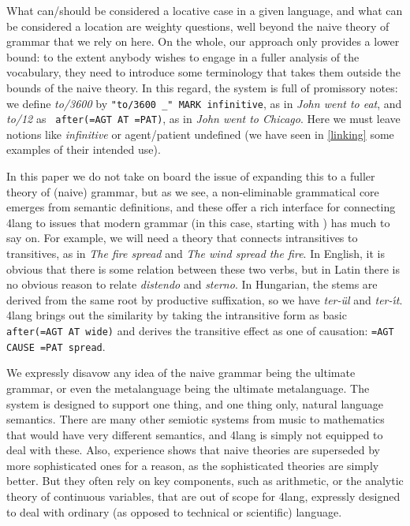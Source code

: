 \documentclass[11pt,bookmarks,bookmarksnumbered,naturalnames,plainpages=false,pdftex,colorlinks=true,urlcolor=blue,bookmarksdepth=subsection,plainpages=false]{paper}
\begin{document}
What can/should be considered a locative case in a given language, and what
can be considered a location are weighty questions, well beyond the naive
theory of grammar that we rely on here. On the whole, our approach only
provides a lower bound: to the extent anybody wishes to engage in a fuller
analysis of the vocabulary, they need to introduce some terminology that takes
them outside the bounds of the naive theory. In this regard, the system is
full of promissory notes: we define {\it to/3600} by {\tt "to/3600 \_" MARK
  infinitive}, as in {\it John went to eat}, and {\it to/12} as {\tt
  after(=AGT AT =PAT)}, as in {\it John went to Chicago}. Here we must
leave notions like {\it infinitive} or agent/patient undefined (we have seen
in \ref{linking} some examples of their intended use).

In this paper we do not take on board the issue of expanding this to a fuller
theory of (naive) grammar, but as we see, a non-eliminable grammatical
core emerges from semantic definitions, and these offer a rich interface for
connecting 4lang to issues that modern grammar (in this case, starting with
\cite{Fillmore:1968}) has much to say on. For example, we will need a theory
that connects intransitives to transitives, as in {\it The fire spread} and
{\it The wind spread the fire}. In English, it is obvious that there is some
relation between these two verbs, but in Latin there is no obvious reason to
relate {\it distendo} and {\it sterno}. In Hungarian, the stems are derived
from the same root by productive suffixation, so we have {\it ter-\"ul} and
{\it ter-\'{\i}t}. 4lang brings out the similarity by taking the intransitive
form as basic {\tt after(=AGT AT wide)} and derives the transitive effect
as one of causation: {\tt =AGT CAUSE {=PAT spread}}.

We expressly disavow any idea of the naive grammar being the ultimate grammar,
or even the metalanguage being the ultimate metalanguage. The system is
designed to support one thing, and one thing only, natural language
semantics. There are many other semiotic systems from music to mathematics
that would have very different semantics, and 4lang is simply not equipped to
deal with these. Also, experience shows that naive theories are superseded by
more sophisticated ones for a reason, as the sophisticated theories are simply
better. But they often rely on key components, such as arithmetic, or the
analytic theory of continuous variables, that are out of scope for 4lang,
expressly designed to deal with ordinary (as opposed to technical or
scientific) language.
\end{document}
